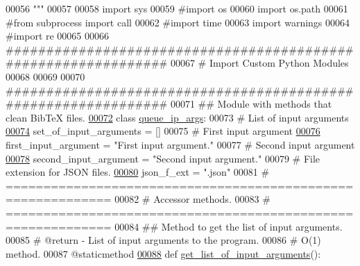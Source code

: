 \begin{DoxyCode}
00056 \textcolor{stringliteral}{"""}
00057 
00058 \textcolor{keyword}{import} sys
00059 \textcolor{comment}{#import os}
00060 \textcolor{keyword}{import} os.path
00061 \textcolor{comment}{#from subprocess import call}
00062 \textcolor{comment}{#import time}
00063 \textcolor{keyword}{import} warnings
00064 \textcolor{comment}{#import re}
00065 
00066 \textcolor{comment}{###############################################################}
00067 \textcolor{comment}{#   Import Custom Python Modules}
00068 
00069 
00070 \textcolor{comment}{###############################################################}
00071 \textcolor{comment}{##  Module with methods that clean BibTeX files.}
\hypertarget{queue__ip__arguments_8py_source_l00072}{}\hyperlink{classutilities_1_1queue__ip__arguments_1_1queue__ip__args}{00072} \textcolor{keyword}{class }\hyperlink{classutilities_1_1queue__ip__arguments_1_1queue__ip__args}{queue\_ip\_args}:
00073     \textcolor{comment}{#   List of input arguments}
\hypertarget{queue__ip__arguments_8py_source_l00074}{}\hyperlink{classutilities_1_1queue__ip__arguments_1_1queue__ip__args_acc8e7685be71a7f95ede7c980355c9f3}{00074}     set\_of\_input\_arguments = []
00075     \textcolor{comment}{#   First input argument}
\hypertarget{queue__ip__arguments_8py_source_l00076}{}\hyperlink{classutilities_1_1queue__ip__arguments_1_1queue__ip__args_a14394c9820086e09d5b926d9910a180f}{00076}     first\_input\_argument = \textcolor{stringliteral}{"First input argument."}
00077     \textcolor{comment}{#   Second input argument}
\hypertarget{queue__ip__arguments_8py_source_l00078}{}\hyperlink{classutilities_1_1queue__ip__arguments_1_1queue__ip__args_a0b179a70c0e57de2794d0d532e534c9c}{00078}     second\_input\_argument = \textcolor{stringliteral}{"Second input argument."}
00079     \textcolor{comment}{#   File extension for JSON files.}
\hypertarget{queue__ip__arguments_8py_source_l00080}{}\hyperlink{classutilities_1_1queue__ip__arguments_1_1queue__ip__args_a8d93f9ade7608583602a9948c0d744f7}{00080}     json\_f\_ext = \textcolor{stringliteral}{".json"}
00081     \textcolor{comment}{# ============================================================}
00082     \textcolor{comment}{#   Accessor methods.}
00083     \textcolor{comment}{# ============================================================}
00084     \textcolor{comment}{##  Method to get the list of input arguments.}
00085     \textcolor{comment}{#   @return - List of input arguments to the program.}
00086     \textcolor{comment}{#   O(1) method.}
00087     @staticmethod
\hypertarget{queue__ip__arguments_8py_source_l00088}{}\hyperlink{classutilities_1_1queue__ip__arguments_1_1queue__ip__args_a1ace4b3c7b9a9e97a872c3a04337442c}{00088}     \textcolor{keyword}{def }\hyperlink{classutilities_1_1queue__ip__arguments_1_1queue__ip__args_a1ace4b3c7b9a9e97a872c3a04337442c}{get\_list\_of\_input\_arguments}():

\end{DoxyCode}
